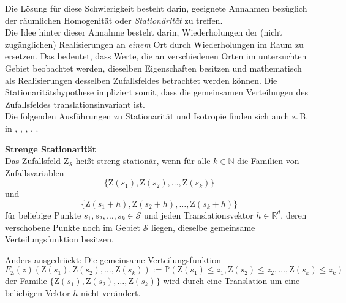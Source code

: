 Die Lösung für diese Schwierigkeit besteht darin, geeignete
Annahmen bezüglich der räumlichen Homogenität oder
 \textit{Stationärität} zu treffen.\\ 
Die Idee hinter dieser Annahme besteht darin,
Wiederholungen der (nicht zugänglichen) Realisierungen an
\textit{einem} Ort durch Wiederholungen im Raum zu ersetzen.
Das bedeutet, dass Werte, die an verschiedenen Orten
im untersuchten Gebiet beobachtet werden, dieselben Eigenschaften
besitzen und mathematisch als Realisierungen desselben 
Zufallsfeldes betrachtet werden können.
Die Stationaritätshypothese impliziert somit, dass die 
gemeinsamen Verteilungen des Zufallsfeldes 
translationsinvariant ist.\\

Die folgenden Ausführungen zu Stationarität und Isotropie
finden sich auch z.\,B.\,in 
\cite[S.\,52-53]{Cressie1993}, \cite[S.\,16-17]{Chiles1999},
\cite[S.\,14-16]{Montero2015}, \cite[S.\,107]{Benndorf2023},
\cite[S.\,52-57]{Schmid2025}.

\begin{definition} \textbf{Strenge Stationarität} \\
Das Zufallsfeld $\mathrm{Z}_\mathcal{S}$ heißt 
\underline{streng stationär}, wenn für alle $k \in \mathbb{N}$ 
die Familien von Zufallsvariablen
\begin{equation*}
\lbrace \mathrm{Z}(s_1), \mathrm{Z}(s_2), \ldots, \mathrm{Z}(s_k)
\rbrace
\end{equation*}
und
\begin{equation*}
\lbrace \mathrm{Z}(s_1+h), \mathrm{Z}(s_2+h), \ldots,\mathrm{Z}(s_k+h)
\rbrace
\end{equation*}
für beliebige Punkte $s_1, s_2, \ldots, s_k \in \mathcal{S}$
und jeden Translationsvektor $h \in \mathbb{R}^d$,
deren verschobene Punkte noch im Gebiet $\mathcal{S}$ liegen,
dieselbe gemeinsame Verteilungsfunktion besitzen.

Anders ausgedrückt:
Die gemeinsame Verteilungsfunktion
\begin{equation*}
F_\mathrm{Z}(z)\left( \mathrm{Z}(s_1), \mathrm{Z}(s_2), \ldots, \mathrm{Z}(s_k) \right):= \mathbb{P}\left(
\mathrm{Z}(s_1) \leq z_1, \mathrm{Z}(s_2) \leq z_2, \ldots, 
\mathrm{Z}(s_k) \leq z_k\right)
\end{equation*}
der Familie $\lbrace \mathrm{Z}(s_1), \mathrm{Z}(s_2), \ldots, 
\mathrm{Z}(s_k)\rbrace$ wird durch eine Translation um eine 
beliebigen Vektor $h$ nicht verändert.
\end{definition}


